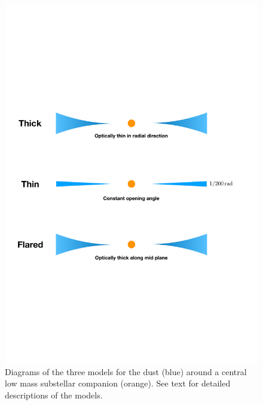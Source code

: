 \documentclass[twocolumn]{aa} %
\begin{document}
\begin{figure}[tbh]
\begin{center}
\includegraphics[width=\columnwidth]{model_sketch.pdf}
\caption{\label{fig:diskmodels}Diagrams of the three models for the dust (blue) around a central low mass substellar companion (orange). See text for detailed descriptions of the models.}

\end{center}
\end{figure}%
\end{document}
